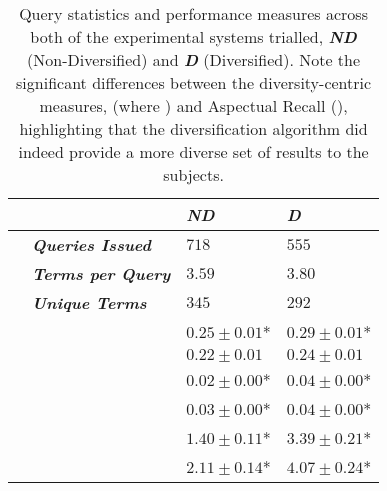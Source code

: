 \begin{table}[t]
    \caption{Query statistics and performance measures across both of the experimental systems trialled, \textbf{\textit{ND}} (Non-Diversified) and \textbf{\textit{D}} (Diversified). Note the significant differences between the diversity-centric measures,  (where ) and Aspectual Recall (), highlighting that the diversification algorithm did indeed provide a more diverse set of results to the subjects.\vspace*{-2mm}}
    \label{tbl_queryperf_2018}
    \renewcommand{\arraystretch}{1.4}
    \begin{center}
    \begin{tabulary}{\textwidth}{L{0.2cm}L{2.65cm}|D{2.1cm}|D{2.1cm}}
    \hline
    
    &  & \textbf{\emph{ND}} & \textbf{\emph{D}} \\ \hline\hline
    & \textbf{\emph{Queries Issued}} & $718$ & $555$ \\ \hline
    & \textbf{\emph{Terms per Query}} & $3.59$ & $3.80$ \\ \hline
	& \textbf{\emph{Unique Terms}} & $345$ & $292$ \\ \hline\hline
     
     &  & $0.25\pm 0.01$* & $0.29\pm 0.01$*  \\ 
	&  & $0.22\pm 0.01$ & $0.24\pm 0.01$  \\ \hline\hline
      
     &  & $0.02\pm 0.00$* & $0.04\pm 0.00$* \\ 
    &  & $0.03\pm 0.00$* & $0.04\pm 0.00$* \\ \hline\hline
       
     &  & $1.40\pm 0.11$* & $3.39\pm 0.21$*  \\ 
    &  & $2.11\pm 0.14$* & $4.07\pm 0.24$*  \\ \hline
	
    \end{tabulary}
    \vspace*{-4mm}
    \end{center}
\end{table}

